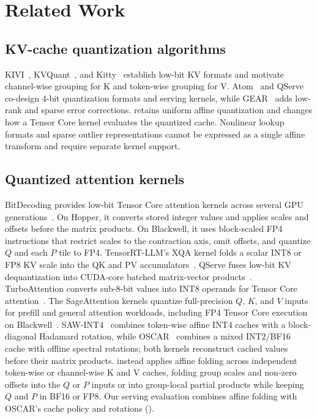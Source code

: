 \section{Related Work}
\label{sec:related}

\subsection{KV-cache quantization algorithms}

KIVI~\cite{liu2024kivi}, KVQuant~\cite{hooper2024kvquant}, and Kitty~\cite{xia2025kitty} establish low-bit KV formats and motivate channel-wise grouping for K and token-wise grouping for V.
Atom~\cite{zhao2024atom} and QServe~\cite{lin2025qserve} co-design 4-bit quantization formats and serving kernels, while GEAR~\cite{kang2024gear} adds low-rank and sparse error corrections.
\sys{} retains uniform affine quantization and changes how a Tensor Core kernel evaluates the quantized cache.
Nonlinear lookup formats and sparse outlier representations cannot be expressed as a single affine transform and require separate kernel support.

\subsection{Quantized attention kernels}

BitDecoding provides low-bit Tensor Core attention kernels across several GPU generations~\cite{du2026bitdecoding}.
On Hopper, it converts stored integer values and applies scales and offsets before the matrix products.
On Blackwell, it uses block-scaled FP4 instructions that restrict scales to the contraction axis, omit offsets, and quantize $Q$ and each $P$ tile to FP4.
TensorRT-LLM's XQA kernel folds a scalar INT8 or FP8 KV scale into the QK and PV accumulators~\cite{nvidia2026trtllm}.
QServe fuses low-bit KV dequantization into CUDA-core batched matrix-vector products~\cite{lin2025qserve}.
TurboAttention converts sub-8-bit values into INT8 operands for Tensor Core attention~\cite{kang2025turboattention}.
The SageAttention kernels quantize full-precision $Q$, $K$, and $V$ inputs for prefill and general attention workloads, including FP4 Tensor Core execution on Blackwell~\cite{zhang2025sageattention,zhang2025sageattention2,zhang2025sageattention3}.
SAW-INT4~\cite{jia2026saw} combines token-wise affine INT4 caches with a block-diagonal Hadamard rotation, while OSCAR~\cite{zhou2026oscar} combines a mixed INT2/BF16 cache with offline spectral rotations; both kernels reconstruct cached values before their matrix products.
\sys{} instead applies affine folding across independent token-wise or channel-wise K and V caches, folding group scales and non-zero offsets into the $Q$ or $P$ inputs or into group-local partial products while keeping $Q$ and $P$ in BF16 or FP8.
Our serving evaluation combines affine folding with OSCAR's cache policy and rotations ().

